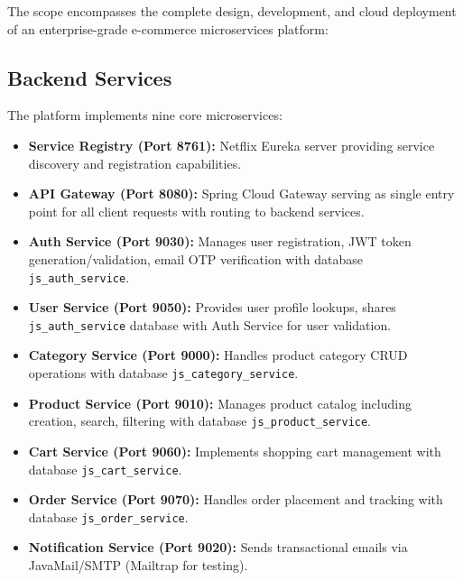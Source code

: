 The scope encompasses the complete design, development, and cloud deployment of an enterprise-grade e-commerce microservices platform:

\subsection{Backend Services}

The platform implements nine core microservices:

\begin{itemize}
    \item \textbf{Service Registry (Port 8761):} Netflix Eureka server providing service discovery and registration capabilities.
    
    \item \textbf{API Gateway (Port 8080):} Spring Cloud Gateway serving as single entry point for all client requests with routing to backend services.
    
    \item \textbf{Auth Service (Port 9030):} Manages user registration, JWT token generation/validation, email OTP verification with database \texttt{js\_auth\_service}.
    
    \item \textbf{User Service (Port 9050):} Provides user profile lookups, shares \texttt{js\_auth\_service} database with Auth Service for user validation.
    
    \item \textbf{Category Service (Port 9000):} Handles product category CRUD operations with database \texttt{js\_category\_service}.
    
    \item \textbf{Product Service (Port 9010):} Manages product catalog including creation, search, filtering with database \texttt{js\_product\_service}.
    
    \item \textbf{Cart Service (Port 9060):} Implements shopping cart management with database \texttt{js\_cart\_service}.
    
    \item \textbf{Order Service (Port 9070):} Handles order placement and tracking with database \texttt{js\_order\_service}.
    
    \item \textbf{Notification Service (Port 9020):} Sends transactional emails via JavaMail/SMTP (Mailtrap for testing).
\end{itemize}


